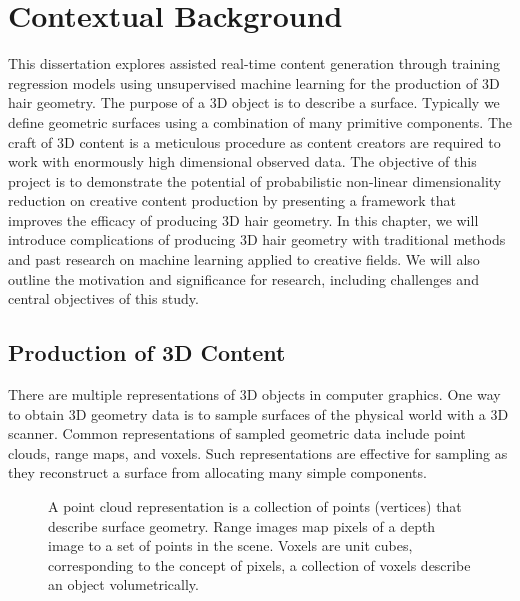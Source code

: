 \documentclass[ %
author={Dillon Keith Diep},
supervisor={Dr. Carl Henrik Ek},
degree={MEng},
title={ART-CG:},
subtitle={Assisted Real-time Content Generation of 3D Hair by Learning Manifolds},
type={Research},
year={2017} ]{dissertation}
\begin{document}
\mainmatter


\chapter{Contextual Background}
\label{chap:context}
This dissertation explores assisted real-time content generation through training regression models using unsupervised machine learning for the production of 3D hair geometry.
The purpose of a 3D object is to describe a surface. Typically we define geometric surfaces using a combination of many primitive components. The craft of 3D content is a meticulous procedure as content creators are required to work with enormously high dimensional observed data.
The objective of this project is to demonstrate the potential of probabilistic non-linear dimensionality reduction on creative content production by presenting a framework that improves the efficacy of producing 3D hair geometry. 
In this chapter, we will introduce complications of producing 3D hair geometry with traditional methods and past research on machine learning applied to creative fields. We will also outline the motivation and significance for research, including challenges and central objectives of this study.

\section{Production of 3D Content}
There are multiple representations of 3D objects in computer graphics. One way to obtain 3D geometry data is to sample surfaces of the physical world with a 3D scanner. Common representations of sampled geometric data include point clouds, range maps, and voxels. Such representations are effective for sampling as they reconstruct a surface from allocating many simple components.

\begin{figure}[!h]
	\centering
	\caption{A point cloud representation is a collection of points (vertices) that describe surface geometry. Range images map pixels of a depth image to a set of points in the scene. Voxels are unit cubes, corresponding to the concept of pixels, a collection of voxels describe an object volumetrically.}
\end{figure}
\end{document}
